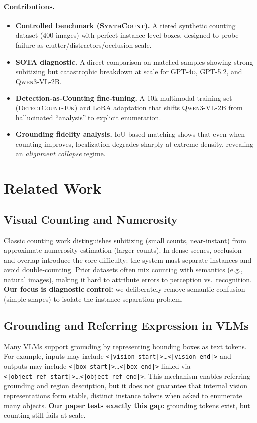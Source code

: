 \documentclass[10pt]{article}
\newcommand{\dataset}{\textsc{SynthCount}\xspace}         %
\newcommand{\trainset}{\textsc{DetectCount-10k}\xspace}   %
\newcommand{\gptfour}{\textsc{GPT-4o}\xspace}
\newcommand{\gptfive}{\textsc{GPT-5.2}\xspace}
\newcommand{\qwenbase}{\textsc{Qwen3-VL-2B}\xspace}
\newcommand{\visionstart}{\texttt{<|vision\_start|>}\xspace}
\newcommand{\visionend}{\texttt{<|vision\_end|>}\xspace}
\newcommand{\boxstart}{\texttt{<|box\_start|>}\xspace}
\newcommand{\boxend}{\texttt{<|box\_end|>}\xspace}
\newcommand{\objrefstart}{\texttt{<|object\_ref\_start|>}\xspace}
\newcommand{\objrefend}{\texttt{<|object\_ref\_end|>}\xspace}
\begin{document}
\paragraph{Contributions.}
\begin{itemize}[leftmargin=1.2em]
  \item \textbf{Controlled benchmark (\dataset).} A tiered synthetic counting dataset (400 images) with perfect instance-level boxes, designed to probe failure as clutter/distractors/occlusion scale.
  \item \textbf{SOTA diagnostic.} A direct comparison on matched samples showing strong subitizing but catastrophic breakdown at scale for \gptfour, \gptfive, and \qwenbase.
  \item \textbf{Detection-as-Counting fine-tuning.} A 10k multimodal training set (\trainset) and LoRA adaptation that shifts \qwenbase from hallucinated ``analysis'' to explicit enumeration.
  \item \textbf{Grounding fidelity analysis.} IoU-based matching shows that even when counting improves, localization degrades sharply at extreme density, revealing an \emph{alignment collapse} regime.
\end{itemize}

\section{Related Work}
\subsection{Visual Counting and Numerosity}
Classic counting work distinguishes subitizing (small counts, near-instant) from approximate numerosity estimation (larger counts).
In dense scenes, occlusion and overlap introduce the core difficulty: the system must separate instances and avoid double-counting.
Prior datasets often mix counting with semantics (e.g., natural images), making it hard to attribute errors to perception vs.\ recognition.
\textbf{Our focus is diagnostic control:} we deliberately remove semantic confusion (simple shapes) to isolate the instance separation problem.

\subsection{Grounding and Referring Expression in VLMs}
Many VLMs support grounding by representing bounding boxes as text tokens.
For example, inputs may include \visionstart \dots \visionend and outputs may include \boxstart \dots \boxend linked via \objrefstart \dots \objrefend.
This mechanism enables referring-grounding and region description, but it does not guarantee that internal vision representations form stable, distinct instance tokens when asked to enumerate many objects.
\textbf{Our paper tests exactly this gap:} grounding tokens exist, but counting still fails at scale.
\end{document}
